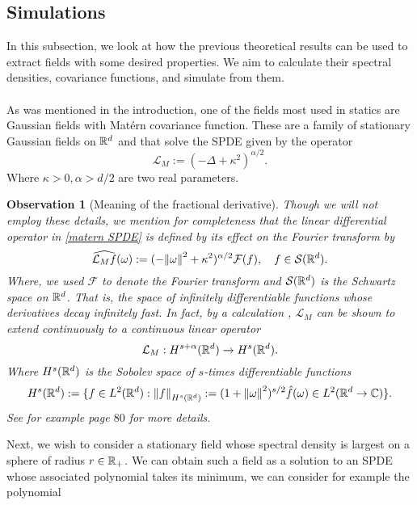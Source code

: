 \documentclass[12pt]{article}
\newtheorem{observation}{Observation}
\begin{document}
\subsection{Simulations}\label{simulations section}
In this subsection, we look at how the previous theoretical results can be used to extract fields with some desired properties. We aim to calculate their spectral densities, covariance functions, and simulate from them.\\
\\
As was mentioned in the introduction, one of the fields most used in statics are Gaussian fields with Matérn covariance function. These are a family of stationary Gaussian fields on ${\mathbb R}^d$ and that solve the SPDE given by the operator
\begin{equation}\label{matern SPDE}
    \mathcal{L}_M:=(-\Delta+\kappa^2)^{\alpha/2}.
\end{equation}
Where $\kappa>0,\alpha>d/2$ are two real parameters.
\begin{observation}[Meaning of the fractional derivative]
    Though we will not employ these details, we mention for completeness that the linear differential operator in \eqref{matern SPDE} is defined by its effect on the Fourier transform by
    \begin{equation*}
        \widehat{\mathcal{L}_Mf}(\omega):=(-\norm{\omega}^2+\kappa^2)^{\alpha/2}\mathcal{F}({f}),\quad f\in\mathcal{S}({\mathbb R}^d).
    \end{equation*}
    Where, we used $\mathcal{F}$ to denote the Fourier transform and $\mathcal{S}({\mathbb R}^d)$ is the Schwartz space on ${\mathbb R}^d$. That is, the space of infinitely differentiable functions whose derivatives decay infinitely fast. In fact, by a calculation , $\mathcal{L}_M$ can be shown to extend continuously to a continuous linear operator
    \begin{equation*}
        \mathcal{L}_M: H^{s+\alpha}({\mathbb R}^d)\to H^s({\mathbb R}^d).
    \end{equation*}
    Where $H^s({\mathbb R}^d)$ is the Sobolev space of $s$-times differentiable functions
    \begin{equation*}
        H^s({\mathbb R}^d):=\lbrace f\in L^2({\mathbb R}^d):\norm{f}_{ H^s({\mathbb R}^d)}:= (1+\norm{\omega}^2)^{s/2}\hat{f}(\omega)\in L^2({\mathbb R}^d\to\mathbb{C})\rbrace.
    \end{equation*}
    See for example \cite{lototsky2017stochastic} page $80$ for more details.
\end{observation}
Next, we wish to consider a stationary field whose spectral density is largest on a sphere of radius $r\in {\mathbb R}_+$. We can obtain such a field as a solution to an SPDE whose associated polynomial takes its minimum, we can consider for example the polynomial
\end{document}
